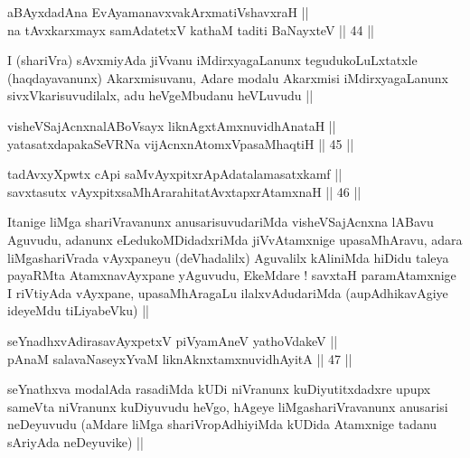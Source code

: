 \begin{shl}
aBAyxdadAna EvAyamanavxvakArxmatiVshavxraH || \\
na tAvxkarxmayx samAdatetxV kathaM taditi BaNayxteV ||  44 ||  
\end{shl}

\begin{artha}
I (shariVra) sAvxmiyAda jiVvanu iMdirxyagaLanunx tegudukoLuLxtatxle
(haqdayavanunx) Akarxmisuvanu, Adare modalu Akarxmisi iMdirxyagaLanunx
sivxVkarisuvudilalx, adu heVgeMbudanu heVLuvudu ||
\end{artha}


\begin{shl}
visheVSajAcnxnalABoV\s sayx liknAgxtAmxnuvidhAnataH || \\
yatasatxdapakaSeVRNa vijAcnxnAtomxVpasaMhaqtiH ||  45 ||  
\end{shl}
				
\begin{shl}
tadAvxyXpwtx cApi saMvAyxpitxrApAdatalamasatxkamf || \\
savxtasutx vAyxpitxsaMhArarahitatAvxtapxrAtamxnaH ||  46 ||  
\end{shl}

\begin{artha}
Itanige liMga shariVravanunx anusarisuvudariMda visheVSajAcnxna lABavu
Aguvudu, adanunx eLedukoMDidadxriMda jiVvAtamxnige upasaMhAravu, adara
liMgashariVrada vAyxpaneyu (deVhadalilx) Aguvalilx kAliniMda hiDidu
taleya payaRMta AtamxnavAyxpane yAguvudu, EkeMdare ! savxtaH
paramAtamxnige I riVtiyAda vAyxpane, upasaMhAragaLu ilalxvAdudariMda
(aupAdhikavAgiye ideyeMdu tiLiyabeVku) ||
\end{artha}


\begin{shl}
seYnadhxvAdirasavAyxpetxV piVyamAneV yathoVdakeV || \\
pAnaM salavaNaseyxYvaM liknAknxtamxnuvidhAyitA ||  47 ||  
\end{shl}

\begin{artha}
seYnathxva modalAda rasadiMda kUDi niVranunx kuDiyutitxdadxre upupx
sameVta niVranunx kuDiyuvudu heVgo, hAgeye liMgashariVravanunx
anusarisi neDeyuvudu (aMdare liMga shariVropAdhiyiMda kUDida Atamxnige
tadanu sAriyAda neDeyuvike) ||
\end{artha}

